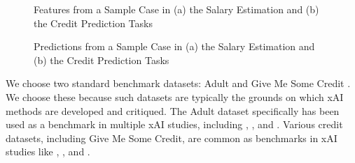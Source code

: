 \begin{figure}[htbp]
    \hspace{\fill}
    \hspace{\fill}
    \hspace{\fill}
    \caption{Features from a Sample Case in (a) the Salary Estimation and (b) the Credit Prediction Tasks}
    \label{fig:survey_table}
\end{figure}

\begin{figure}[htbp]
    \hspace{\fill}
    \hspace{\fill}
    \hspace{\fill}
    \caption{Predictions from a Sample Case in (a) the Salary Estimation and (b) the Credit Prediction Tasks}
    \label{fig:survey_pred}
\end{figure}

We choose two standard benchmark datasets: Adult and Give Me Some Credit \cite{kohavi_scaling_1996,GiveMeSomeCredit}. We choose these because such datasets are typically the grounds on which xAI methods are developed and critiqued. The Adult dataset specifically has been used as a benchmark in multiple xAI studies, including \textcite{weerts_case-based_2019}, \textcite{weerts_human-grounded_2019}, and \textcite{ribeiro_anchors_2018}. Various credit datasets, including Give Me Some Credit, are common as benchmarks in xAI studies like \textcite{bansal_does_2021}, \textcite{ustun_learning_nodate}, and \textcite{krishna_disagreement_2022}.

